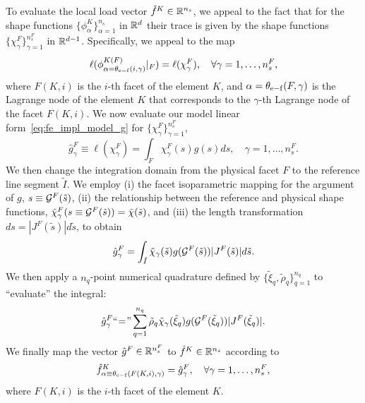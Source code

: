 To evaluate the local load vector $\tilde f^K \in \mathbb{R}^{n_s}$, we appeal to the fact that for the shape functions $\{\phi^K_{\alpha}\}_{\alpha=1}^{n_s}$ in $\mathbb{R}^d$ their trace is given by the shape functions $\{\chi^F_\gamma\}_{\gamma=1}^{n_s^F}$ in $\mathbb{R}^{d-1}$.  Specifically, we appeal to the map
\begin{equation*}
  \ell(\phi^{K(F)}_{\alpha = \theta_{\rm e-f}(i,\gamma)}|_{F}) = \ell(\chi_\gamma^{F}), \quad \forall \gamma = 1,\dots,n_s^F,
\end{equation*}
where $F(K,i)$ is the $i$-th facet of the element $K$, and $\alpha = \theta_{\rm e-f}(F,\gamma)$ is the Lagrange node of the element $K$ that corresponds to the $\gamma$-th Lagrange node of the facet $F(K,i)$.  We now evaluate our model linear form~\eqref{eq:fe_impl_model_g} for $\{\chi_\gamma^F\}_{\gamma=1}^{n_s^F}$, 
\begin{equation*}
  \hat g^F_\gamma \equiv \ell(\chi_\gamma^F) = \int_{F} \chi^F_\gamma(s) g(s) ds, \quad \gamma = 1,\dots,n_s^F.
\end{equation*}
We then change the integration domain from the physical facet $F$ to the reference line segment $\tilde I$.  We employ (i) the facet isoparametric mapping for the argument of $g$, $s \equiv \mathcal{G}^F(\tilde s)$, (ii) the relationship between the reference and physical shape functions, $\tilde \chi^F_\gamma(s \equiv \mathcal{G}^F(\tilde s)) = \tilde \chi(\tilde s)$, and (iii) the length transformation $ds = |J^F(\tilde s)|d \tilde s$, to obtain
\begin{equation*}
  \hat g^F_\gamma = \int_{\tilde I} \tilde \chi_\gamma(\tilde s) g(\mathcal{G}^F(\tilde s)) |J^F(\tilde s)| d \tilde s.
\end{equation*}
We then apply a $n_q$-point numerical quadrature defined by $\{ \tilde \xi_q, \tilde \rho_q \}_{q=1}^{n_q}$ to ``evaluate'' the integral:
\begin{equation*}
  \hat g^F_\gamma
  \text{``}\hspace{-0.2em}=\hspace{-0.2em}\text{''}
  \sum_{q=1}^{n_q} \tilde \rho_q \tilde \chi_\gamma(\tilde \xi_q) g(\mathcal{G}^F(\tilde \xi_q)) |J^F(\tilde \xi_q)| .
\end{equation*}
We finally map the vector $\hat g^F \in \mathbb{R}^{n_s^F}$ to $\hat f^K \in \mathbb{R}^{n_s}$ according to
\begin{equation*}
  \hat f^{K}_{\alpha \equiv \theta_{\rm e-f}(F(K,i),\gamma)} = \hat g^F_\gamma, \quad \forall \gamma = 1,\dots,n_s^F,
\end{equation*}
where $F(K,i)$ is the $i$-th facet of the element $K$.

